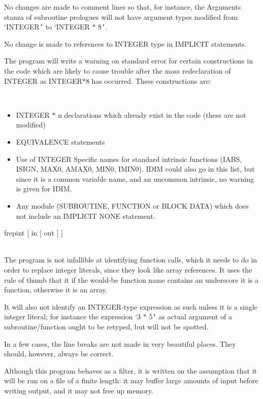 \documentclass[twoside,11pt]{article}
\renewcommand{\_}{\texttt{\symbol{95}}}
\newcommand{\sstusage}[1]{\item[Usage:] \mbox{}
   \begin{description}
      {\ssttt \item #1}
   \end{description}
}
\newcommand{\sstnotes}[1]{\item[Notes:] \mbox{} \\[1.3ex] #1}
\newcommand{\sstitemlist}[1]{
  \mbox{} \\
  \vspace{-3.5ex}
  \begin{itemize}
     #1
  \end{itemize}
}
\newcommand{\sstitem}{\item}
\newcommand{\sstusage}[1]{\item[Usage:]
      \begin{description}
         {\ssttt #1}
      \end{description}
      \\
   }
\newcommand{\sstnotes}[1]{\item[Notes:] #1 }
\newcommand{\sstitemlist}[1]{
      \begin{itemize}
         #1
      \end{itemize}
      \\
   }
\newcommand{\sstitem}{\item}
\begin{document}
{{      No changes are made to comment lines so that, for instance, the
      Arguments stanza of subroutine prologues will not have argument
      types modified from `INTEGER{\tt '} to `INTEGER $*$ 8{\tt '}.

      No change is made to references to INTEGER type in IMPLICIT
      statements.

      The program will write a warning on standard error for certain
      constructions in the code which are likely to cause trouble after
      the mass redeclaration of INTEGER as INTEGER$*$8 has occurred.
      These constructions are:
      \sstitemlist{

         \sstitem
            INTEGER $*$ n declarations which already exist in the code
              (these are not modified)

         \sstitem
            EQUIVALENCE statements

         \sstitem
            Use of INTEGER Specific names for standard intrinsic functions
              (IABS, ISIGN, MAX0, AMAX0, MIN0, IMIN0).  IDIM could also go in
              this list, but since it is a common variable name, and an
              uncommon intrinsic, no warning is given for IDIM.

         \sstitem
            Any module (SUBROUTINE, FUNCTION or BLOCK DATA) which does not
              include an IMPLICIT NONE statement.
      }
   }
   \sstusage{
      frepint [ in [ out ] ]
   }
   \sstnotes{
      The program is not infallible at identifying function calls, which
      it needs to do in order to replace integer literals, since they
      look like array references.  It uses the rule of thumb that it if
      the would-be function name contains an underscore it is a function,
      otherwise it is an array.

      It will also not identify an INTEGER-type expression as such unless
      it is a single integer literal; for instance the expression `3 $*$ 5{\tt '}
      as actual argument of a subroutine/function ought to be retyped,
      but will not be spotted.

      In a few cases, the line breaks are not made in very beautiful places.
      They should, however, always be correct.

      Although this program behaves as a filter, it is written on
      the assumption that it will be run on a file of a finite length:
      it may buffer large amounts of input before writing output, and
      it may not free up memory.
   }
}
\newpage
\end{document}
